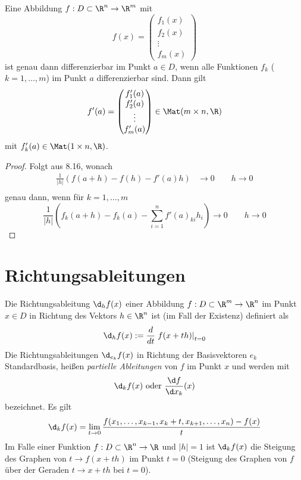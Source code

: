 \documentclass[a4paper,10pt]{scrbook}
\begin{document}
\setcounter{thm}{0}
\begin{st}
\label{13.1}
Eine Abbildung $f:D\subset \R^n\to \R^m$ mit
\[
f(x)=\begin{pmatrix}f_1(x)\\f_2(x)\\\vdots\\f_m(x)\end{pmatrix}
\]
ist genau dann differenzierbar im Punkt $a\in D$, wenn alle Funktionen
$f_k$  ($k=1,\dotsc,m$) im Punkt $a$ differenzierbar sind.
Dann gilt
\[
f'(a)=\begin{pmatrix}f_1'(a)\\f_2'(a)\\\vdots\\f_m'(a)\end{pmatrix}\in \Mat(m\times n, \R)
\]
mit $f_k'(a)\in \Mat(1\times n, \R)$.
\begin{proof}
Folgt aus 8.16, wonach 
\begin{align*}
\frac 1{|h|}(f(a+h)-f(h)-f'(a)h) &\to 0 \qquad h\to 0\\
\end{align*}
genau dann, wenn für $k=1,\dotsc, m$
\[
\frac 1{|h|}(f_k(a+h)-f_k(a)-\sum_{i=1}^nf'(a)_{ki}h_i) \to 0 \qquad h\to 0
\]
\end{proof}
\end{st}

\section*{Richtungsableitungen}

Die Richtungsableitung $\d_hf(x)$ einer Abbildung $f:D\subset \R^m \to \R^n$ im Punkt $x\in D$ in 
Richtung des Vektors $h\in \R^n$ ist (im Fall der Existenz) definiert als
\[
\d_hf(x) := \frac d{dt}\left.f(x+th)\right|_{t=0}
\]
Die Richtungsableitungen $\d_{e_k}f(x)$ in Richtung der Basisvektoren
$e_k$ Standardbasis, heißen \emph{partielle Ableitungen} von $f$ im Punkt $x$ und werden mit
\[
\d_kf(x) \text{ oder } \frac {\d f}{\d x_k}(x)
\]
bezeichnet.
Es gilt
\[
		\d_kf(x)=\lim_{t\to 0}\frac {f(x_1,\dotsc,x_{k-1},x_k+t,x_{k+1},\dotsc,x_n)-f(x)}t
\]
Im Falle einer Funktion $f:D\subset \R^n\to \R$ und $|h|=1$ ist $\d_kf(x)$ die Steigung des Graphen von
$t\to f(x+th)$ im Punkt $t=0$ (Steigung des Graphen von $f$ über der Geraden $t\to x+th$ bei $t=0$).
\end{document}
